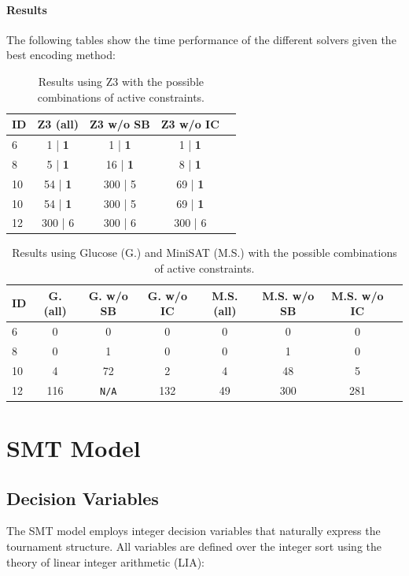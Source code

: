 \documentclass[11pt]{article}
\begin{document}
\paragraph{Results} The following tables show the time performance of the different solvers given the best encoding method:
\begin{table}[H]
\centering
\small
\label{tab:z3}
\begin{tabular}{@{}lcccc@{}}
\toprule
ID & Z3 (all) & Z3 w/o SB & Z3 w/o IC \\
\midrule
6 & 1 | \textbf{1} & 1 | \textbf{1} & 1 | \textbf{1} \\
8 & 5 | \textbf{1} & 16 | \textbf{1} & 8 | \textbf{1}  \\
10 & 54 | \textbf{1} & 300 | 5 & 69 | \textbf{1} \\
10 & 54 | \textbf{1} & 300 | 5 & 69 | \textbf{1} \\
12 & 300 | 6 & 300 | 6 & 300 | 6 \\
\bottomrule
\end{tabular}
\caption{Results using Z3 with the possible combinations of active constraints.}
\end{table}

\begin{table}[H]
\centering
\small
\label{tab:glucosems}
\begin{tabular}{@{}lccccccc@{}}
\toprule
ID & G. (all) & G. w/o SB & G. w/o IC & M.S. (all) & M.S. w/o SB & M.S. w/o IC\\
\midrule
6 & 0 & 0 & 0 & 0 & 0 & 0\\
8 & 0 & 1 & 0 & 0 & 1 & 0 \\
10 & 4 & 72 & 2 & 4 & 48 & 5\\
12 & 116 & \texttt{N/A} & 132 & 49 & 300 & 281\\
\bottomrule
\end{tabular}
\caption{Results using Glucose (G.) and MiniSAT (M.S.) with the possible combinations of active constraints.}
\end{table}

\section{SMT Model}

\subsection{Decision Variables}

The SMT model employs integer decision variables that naturally express the tournament structure. All variables are defined over the integer sort using the theory of linear integer arithmetic (LIA):
\end{document}

